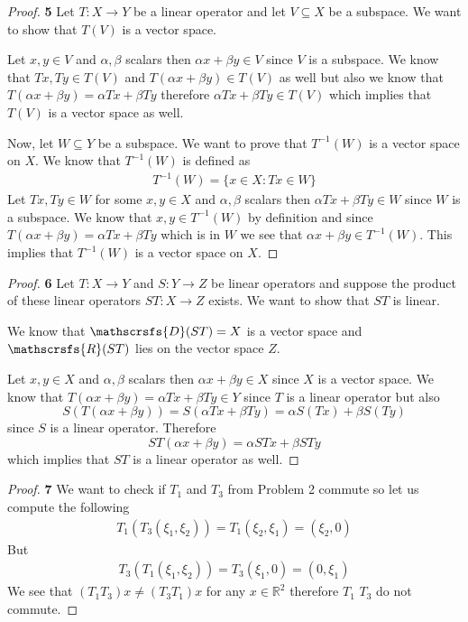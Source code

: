 \documentclass[11pt]{article}
\newcommand{\R}{\mathbb{R}}
\newcommand{\dom}{\mathscrsfs{D}}
\newcommand{\range}{\mathscrsfs{R}}
\theoremstyle{definition}
\begin{document}
\begin{proof}{\textbf{5}}
    Let $T:X\to Y$ be a linear operator and let $V\subseteq X$ be a subspace.
    We want to show that $T(V)$ is a vector space.

    Let $x,y\in V$ and $\alpha, \beta$ scalars then $\alpha x + \beta y \in V$
    since $V$ is a subspace.
    We know that $Tx, Ty \in T(V)$ and $T(\alpha x + \beta y) \in T(V)$ as well
    but also we know that $T(\alpha x + \beta y) = \alpha Tx + \beta Ty$
    therefore $\alpha Tx + \beta Ty \in T(V)$ which implies that $T(V)$ is
    a vector space as well.

    Now, let $W \subseteq Y$ be a subspace. We want to prove that $T^{-1}(W)$
    is a vector space on $X$. We know that $T^{-1}(W)$ is defined as
    \begin{align*}
        T^{-1}(W) = \{x \in X : Tx \in W\}
    \end{align*}
    Let $Tx,Ty\in W$ for some $x,y \in X$ and $\alpha, \beta$ scalars then
    $\alpha Tx + \beta Ty \in W$ since $W$ is a subspace.
    We know that $x, y \in T^{-1}(W)$ by definition and since
    $T(\alpha x + \beta y) = \alpha Tx + \beta Ty$ which is in $W$ we see that
    $\alpha x + \beta y \in T^{-1}(W)$.
    This implies that $T^{-1}(W)$ is a vector space on $X$.
\end{proof}
\begin{proof}{\textbf{6}}
    Let $T:X \to Y$ and $S:Y\to Z$ be linear operators and suppose the product
    of these linear operators $ST: X \to Z$ exists. We want to show that $ST$
    is linear.

    We know that $\dom(ST) = X$ is a vector space and $\range(ST)$ lies on 
    the vector space $Z$.

    Let $x,y \in X$ and $\alpha,\beta$ scalars then $\alpha x + \beta y \in X$
    since $X$ is a vector space.
    We know that $T(\alpha x + \beta y) = \alpha Tx + \beta Ty \in Y$ since
    $T$ is a linear operator but also 
    $$S(T(\alpha x + \beta y)) = S(\alpha Tx + \beta Ty)
    = \alpha S(Tx) + \beta S(Ty)$$
    since $S$ is a linear operator. Therefore
    $$ST(\alpha x + \beta y) = \alpha STx + \beta STy$$
    which implies that $ST$ is a linear operator as well.
\end{proof}
\cleardoublepage
\begin{proof}{\textbf{7}}
    We want to check if $T_1$ and $T_3$ from Problem 2 commute so let us
    compute the following 
    \begin{align*}
        T_1(T_3(\xi_1, \xi_2)) = T_1(\xi_2, \xi_1) = (\xi_2, 0) 
    \end{align*}
    But
    \begin{align*}
        T_3(T_1(\xi_1, \xi_2)) = T_3(\xi_1, 0) = (0, \xi_1) 
    \end{align*}
    We see that $(T_1T_3)x \neq (T_3T_1)x$ for any $x\in \R^2$ therefore $T_1$
    $T_3$ do not commute.
\end{proof}
\end{document}
